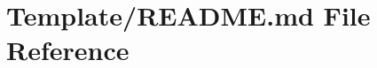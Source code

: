\hypertarget{Template_2README_8md}{\section{Template/\+R\+E\+A\+D\+M\+E.md File Reference}
\label{Template_2README_8md}
}
